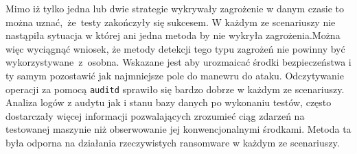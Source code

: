 Mimo iż tylko jedna lub dwie strategie wykrywały zagrożenie w danym czasie to można uznać,~że~testy zakończyły się sukcesem. W każdym ze scenariuszy nie nastąpiła sytuacja w której ani jedna metoda by nie wykryła zagrożenia.Można więc wyciągnąć wniosek, że metody detekcji tego typu zagrożeń nie powinny być wykorzystywane~z~osobna. Wskazane jest aby urozmaicać środki bezpieczeństwa i ty samym pozostawić jak najmniejsze pole do manewru do ataku.
\newline
Odczytywanie operacji za pomocą \texttt{auditd} sprawiło się bardzo dobrze w każdym ze scenariuszy. Analiza logów z audytu jak i stanu bazy danych po wykonaniu testów, często dostarczały więcej informacji pozwalających zrozumieć ciąg zdarzeń na testowanej maszynie niż obserwowanie jej konwencjonalnymi środkami. Metoda ta była odporna na działania rzeczywistych ransomware w każdym ze scenariuszy.
\afterpage{\blankpage}